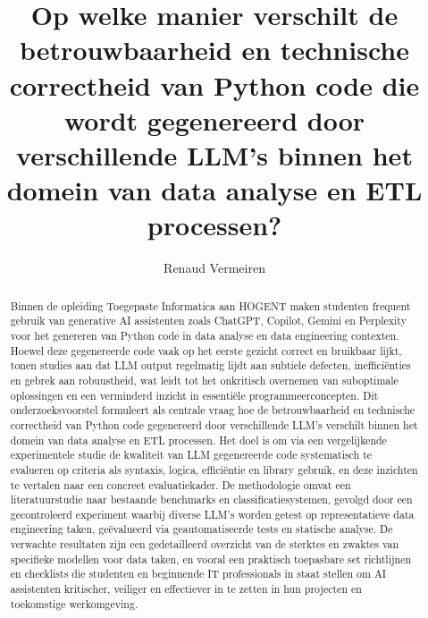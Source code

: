 \documentclass{hogent-article}
\title{Op welke manier verschilt de betrouwbaarheid en technische correctheid van Python code die wordt gegenereerd door verschillende LLM’s binnen het domein van data analyse en ETL processen?}
\author{Renaud Vermeiren}
\begin{document}
\begin{abstract}
    
Binnen de opleiding Toegepaste Informatica aan HOGENT maken studenten frequent gebruik van generative AI assistenten zoals ChatGPT, Copilot, Gemini en Perplexity voor het genereren van Python code in data analyse en data engineering contexten. Hoewel deze gegenereerde code vaak op het eerste gezicht correct en bruikbaar lijkt, tonen studies aan dat LLM output regelmatig lijdt aan subtiele defecten, inefficiënties en gebrek aan robuustheid, wat leidt tot het onkritisch overnemen van suboptimale oplossingen en een verminderd inzicht in essentiële programmeerconcepten. Dit onderzoeksvoorstel formuleert als centrale vraag hoe de betrouwbaarheid en technische correctheid van Python code gegenereerd door verschillende LLM's verschilt binnen het domein van data analyse en ETL processen. Het doel is om via een vergelijkende experimentele studie de kwaliteit van LLM gegenereerde code systematisch te evalueren op criteria als syntaxis, logica, efficiëntie en library gebruik, en deze inzichten te vertalen naar een concreet evaluatiekader. De methodologie omvat een literatuurstudie naar bestaande benchmarks en classificatiesystemen, gevolgd door een gecontroleerd experiment waarbij diverse LLM's worden getest op representatieve data engineering taken, geëvalueerd via geautomatiseerde tests en statische analyse. De verwachte resultaten zijn een gedetailleerd overzicht van de sterktes en zwaktes van specifieke modellen voor data taken, en vooral een praktisch toepasbare set richtlijnen en checklists die studenten en beginnende IT professionals in staat stellen om AI assistenten kritischer, veiliger en effectiever in te zetten in hun projecten en toekomstige werkomgeving.
\end{abstract}

\tableofcontents



\end{document}
